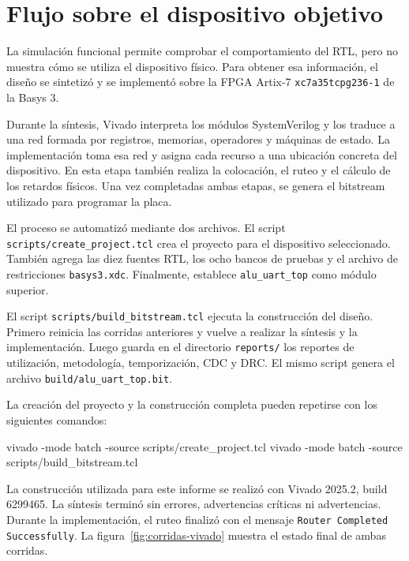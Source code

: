 \section{Flujo sobre el dispositivo objetivo}

La simulación funcional permite comprobar el comportamiento del RTL,
pero no muestra cómo se utiliza el dispositivo físico. Para obtener
esa información, el diseño se sintetizó y se implementó sobre la FPGA
Artix-7 \texttt{xc7a35tcpg236-1} de la Basys 3.

Durante la síntesis, Vivado interpreta los módulos SystemVerilog y
los traduce a una red formada por registros, memorias, operadores y
máquinas de estado. La implementación toma esa red y asigna cada
recurso a una ubicación concreta del dispositivo. En esta etapa
también realiza la colocación, el ruteo y el cálculo de los retardos
físicos. Una vez completadas ambas etapas, se genera el bitstream
utilizado para programar la placa.

El proceso se automatizó mediante dos archivos. El script
\texttt{scripts/create\_project.tcl} crea el proyecto para el
dispositivo seleccionado. También agrega las diez fuentes RTL, los
ocho bancos de pruebas y el archivo de restricciones
\texttt{basys3.xdc}. Finalmente, establece \texttt{alu\_uart\_top}
como módulo superior.

El script \texttt{scripts/build\_bitstream.tcl} ejecuta la
construcción del diseño. Primero reinicia las corridas anteriores y
vuelve a realizar la síntesis y la implementación. Luego guarda en el
directorio \texttt{reports/} los reportes de utilización,
metodología, temporización, CDC y DRC. El mismo script genera el
archivo \texttt{build/alu\_uart\_top.bit}.

La creación del proyecto y la construcción completa pueden repetirse
con los siguientes comandos:

\begin{codebox}
vivado -mode batch -source scripts/create_project.tcl
vivado -mode batch -source scripts/build_bitstream.tcl
\end{codebox}

La construcción utilizada para este informe se realizó con Vivado
2025.2, build 6299465. La síntesis terminó sin errores, advertencias
críticas ni advertencias. Durante la implementación, el ruteo
finalizó con el mensaje \texttt{Router Completed Successfully}. La
figura~\ref{fig:corridas-vivado} muestra el estado final de ambas corridas.

